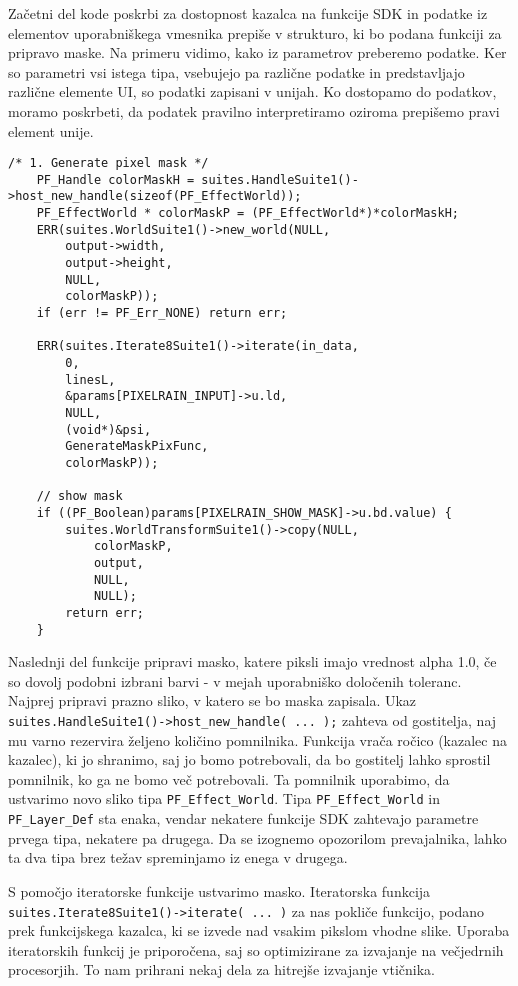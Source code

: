 \documentclass[a4paper, 12pt]{book}
\begin{document}
Začetni del kode poskrbi za dostopnost kazalca na funkcije SDK in podatke iz elementov uporabniškega vmesnika prepiše v strukturo, 
ki bo podana funkciji za pripravo maske.
Na primeru vidimo, kako iz parametrov preberemo podatke.
Ker so parametri vsi istega tipa, vsebujejo pa različne podatke in predstavljajo različne elemente UI, so podatki zapisani v unijah.
Ko dostopamo do podatkov, moramo poskrbeti, da podatek pravilno interpretiramo oziroma prepišemo pravi element unije.

\begin{verbatim}
/* 1. Generate pixel mask */
    PF_Handle colorMaskH = suites.HandleSuite1()->host_new_handle(sizeof(PF_EffectWorld));
    PF_EffectWorld * colorMaskP = (PF_EffectWorld*)*colorMaskH;
    ERR(suites.WorldSuite1()->new_world(NULL,
        output->width,
        output->height,
        NULL,
        colorMaskP));
    if (err != PF_Err_NONE) return err;
    
    ERR(suites.Iterate8Suite1()->iterate(in_data,
        0,                        
        linesL,                   
        &params[PIXELRAIN_INPUT]->u.ld, 
        NULL,                        
        (void*)&psi,        
        GenerateMaskPixFunc,  
        colorMaskP));
    
    // show mask
    if ((PF_Boolean)params[PIXELRAIN_SHOW_MASK]->u.bd.value) {
        suites.WorldTransformSuite1()->copy(NULL,
            colorMaskP,
            output,
            NULL,
            NULL);
        return err;
    }
\end{verbatim}

Naslednji del funkcije pripravi masko, katere piksli imajo vrednost alpha 1.0, če so dovolj podobni izbrani barvi - v mejah uporabniško določenih toleranc.
Najprej pripravi prazno sliko, v katero se bo maska zapisala.
Ukaz \verb!suites.HandleSuite1()->host_new_handle( ... );! zahteva od gostitelja, naj mu varno rezervira željeno količino pomnilnika.
Funkcija vrača ročico (kazalec na kazalec), ki jo shranimo, saj jo bomo potrebovali, da bo gostitelj lahko sprostil pomnilnik, ko ga ne bomo več potrebovali.
Ta pomnilnik uporabimo, da ustvarimo novo sliko tipa \verb!PF_Effect_World!.
Tipa \verb!PF_Effect_World! in \verb!PF_Layer_Def! sta enaka, vendar nekatere funkcije SDK zahtevajo parametre prvega tipa, nekatere pa drugega.
Da se izognemo opozorilom prevajalnika, lahko ta dva tipa brez težav spreminjamo iz enega v drugega.

S pomočjo iteratorske funkcije ustvarimo masko.
Iteratorska funkcija \verb!suites.Iterate8Suite1()->iterate( ... )! za nas pokliče funkcijo, podano prek funkcijskega kazalca, ki se izvede nad vsakim pikslom vhodne slike.
Uporaba iteratorskih funkcij je priporočena, saj so optimizirane za izvajanje na  večjedrnih procesorjih.
To nam prihrani nekaj dela za hitrejše izvajanje vtičnika.
\end{document}
